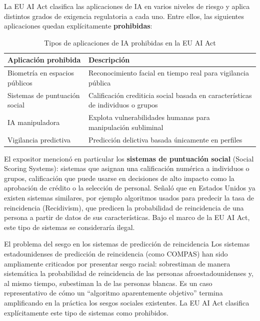 \documentclass[a4paper]{article}
\begin{document}
La EU AI Act clasifica las aplicaciones de IA en varios niveles de riesgo y aplica distintos grados de exigencia regulatoria a cada uno. Entre ellos, las siguientes aplicaciones quedan explícitamente \textbf{prohibidas}:

\begin{table}[H]
\centering
\caption{Tipos de aplicaciones de IA prohibidas en la EU AI Act}
\begin{tabular}{@{}ll@{}}
\toprule
\textbf{Aplicación prohibida} & \textbf{Descripción} \\
\midrule
Biometría en espacios públicos & Reconocimiento facial en tiempo real para vigilancia pública \\
Sistemas de puntuación social & Calificación crediticia social basada en características de individuos o grupos \\
IA manipuladora & Explota vulnerabilidades humanas para manipulación subliminal \\
Vigilancia predictiva & Predicción delictiva basada únicamente en perfiles \\
\bottomrule
\end{tabular}
\end{table}

El expositor mencionó en particular los \textbf{sistemas de puntuación social} (Social Scoring Systems): sistemas que asignan una calificación numérica a individuos o grupos, calificación que puede usarse en decisiones de alto impacto como la aprobación de crédito o la selección de personal. Señaló que en Estados Unidos ya existen sistemas similares, por ejemplo algoritmos usados para predecir la tasa de reincidencia (Recidivism), que predicen la probabilidad de reincidencia de una persona a partir de datos de sus características. Bajo el marco de la EU AI Act, este tipo de sistemas se consideraría ilegal.

\begin{warningbox}{El problema del sesgo en los sistemas de predicción de reincidencia}
Los sistemas estadounidenses de predicción de reincidencia (como COMPAS) han sido ampliamente criticados por presentar sesgo racial: sobrestiman de manera sistemática la probabilidad de reincidencia de las personas afroestadounidenses y, al mismo tiempo, subestiman la de las personas blancas. Es un caso representativo de cómo un ``algoritmo aparentemente objetivo'' termina amplificando en la práctica los sesgos sociales existentes. La EU AI Act clasifica explícitamente este tipo de sistemas como prohibidos.
\end{warningbox}
\end{document}
